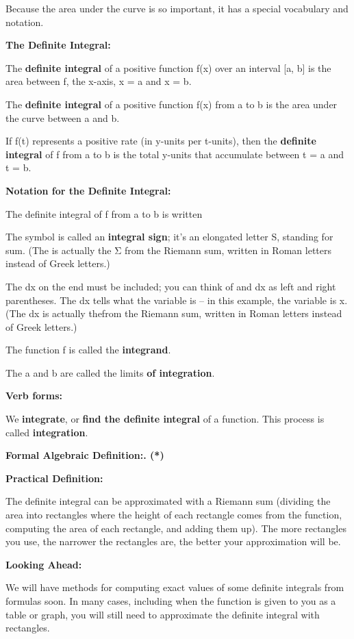 Because the area under the curve is so important, it has a special
vocabulary and notation.

\textbf{The Definite Integral:}

The \textbf{definite integral} of a positive function f(x) over an
interval {[}a, b{]} is the area between f, the x-axis, x = a and x = b.

The \textbf{definite integral} of a positive function f(x) from a to b
is the area under the curve between a and b.

If f(t) represents a positive rate (in y-units per t-units), then the
\textbf{definite integral} of f from a to b is the total y-units that
accumulate between t = a and t = b.

\textbf{Notation for the Definite Integral: }

The definite integral of f from a to b is written

The symbol is called an \textbf{integral sign}; it's an elongated letter
S, standing for sum. (The is actually the Σ from the Riemann sum,
written in Roman letters instead of Greek letters.)

The dx on the end must be included; you can think of and dx as left and
right parentheses. The dx tells what the variable is -- in this example,
the variable is x. (The dx is actually thefrom the Riemann sum, written
in Roman letters instead of Greek letters.)

The function f is called the \textbf{integrand}.

The a and b are called the limits \textbf{of integration}.

\textbf{Verb forms:}

We \textbf{integrate}, or \textbf{find the definite integral} of a
function. This process is called \textbf{integration}.

\textbf{Formal Algebraic Definition:. (*)}

\textbf{Practical Definition:}

The definite integral can be approximated with a Riemann sum (dividing
the area into rectangles where the height of each rectangle comes from
the function, computing the area of each rectangle, and adding them up).
The more rectangles you use, the narrower the rectangles are, the better
your approximation will be.

\textbf{Looking Ahead:}

We will have methods for computing exact values of some definite
integrals from formulas soon. In many cases, including when the function
is given to you as a table or graph, you will still need to approximate
the definite integral with rectangles.

